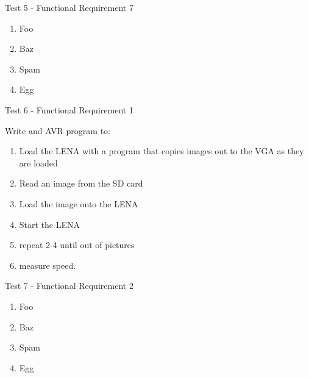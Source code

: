 {\sc Test 5 - Functional Requirement 7}

{\em \FRVII}

\begin{enumerate}
\item Foo
\item Baz
\item Spam
\item Egg
\end{enumerate}

{\sc Test 6 - Functional Requirement 1}

{\em \FRI}
Write and AVR program to:
\begin{enumerate}
\item Load the LENA with a program that copies images out to the VGA as they are loaded
\item Read an image from the SD card
\item Load the image onto the LENA
\item Start the LENA
\item repeat 2-4 until out of pictures
\item measure speed.
\end{enumerate}

{\sc Test 7 - Functional Requirement 2}

{\em \FRII}

\begin{enumerate}
\item Foo
\item Baz
\item Spam
\item Egg
\end{enumerate}
